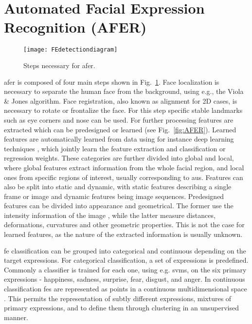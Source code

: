 \section{Automated Facial Expression Recognition (AFER)}
\label{sec:afer}

\begin{figure}
    \centering
    \texttt{[image: FEdetectiondiagram]}
    \caption{Steps necessary for \gls{afer}.}
    \label{fig:FEdiagram}
\end{figure}

\gls{afer} is composed of four main steps shown in Fig.~\ref{fig:FEdiagram}\cite{Cohn2014,Fasel2003}. Face localization is necessary to separate the human face from the background, using e.g., the Viola \& Jones algorithm. Face registration, also known as alignment for 2D cases, is necessary to rotate or frontalize the face. For this step specific stable landmarks such as eye corners and nose can be used. For further processing features are extracted which can be predesigned or learned (see Fig.~\ref{fig:AFER}). Learned features are automatically learned from data using for instance deep learning techniques \cite{Jaiswal2016}, which jointly learn the feature extraction and classification or regression weights. These categories are further divided into global and local, where global features extract information from the whole facial region, and local ones from specific regions of interest, usually corresponding to \glspl{au}. Features can also be split into static and dynamic, with static features describing a single frame or
image and dynamic features being image sequences\cite{Valstar2006}. Predesigned features can be divided into appearance and geometrical\cite{Mishra2015}. The former use the intensity information of the image \cite{Lucey2007}, while the latter measure distances, deformations, curvatures and other geometric properties. This is not the case for learned features, as the nature of the extracted information is usually unknown.

\Gls{fe} classification can be grouped into categorical and continuous depending on the target expressions\cite{Tian2005}. For categorical classification, a set of expressions is predefined\cite{Chu2016}. Commonly a classifier is trained for each one, using e.g. \glspl{svm}\cite{Simon2010}, on the six primary expressions - happiness, sadness, surprise, fear, disgust, and anger. In continuous classification \glspl{fe} are represented as points in a
continuous multidimensional space \cite{Zeng2009survey}. This permits the representation of subtly different
expressions, mixtures of primary expressions, and to define them through clustering in an unsupervised manner. 


